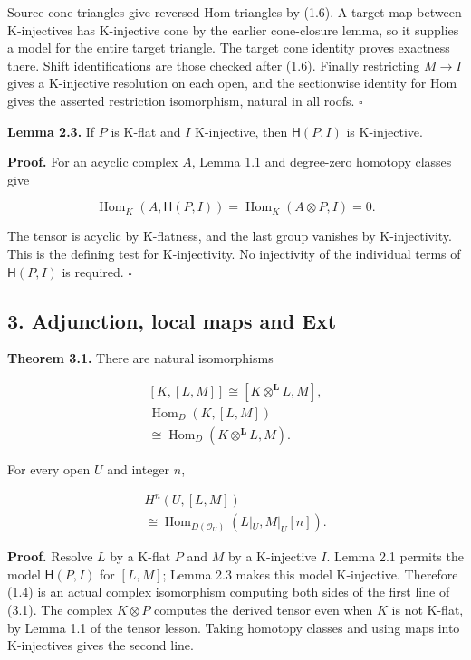 \documentclass[
  english,
  11pt,
  a4paper,
]{article}
\begin{document}
Source cone triangles give reversed Hom triangles by (1.6). A target map
between K-injectives has K-injective cone by the earlier cone-closure
lemma, so it supplies a model for the entire target triangle. The target
cone identity proves exactness there. Shift identifications are those
checked after (1.6). Finally restricting \(M\to I\) gives a K-injective
resolution on each open, and the sectionwise identity for Hom gives the
asserted restriction isomorphism, natural in all roofs. \(\square\)

\textbf{Lemma 2.3.} If \(P\) is K-flat and \(I\) K-injective, then
\(\mathsf H(P,I)\) is K-injective.

\textbf{Proof.} For an acyclic complex \(A\), Lemma 1.1 and degree-zero
homotopy classes give

\[\operatorname{Hom}_K(A,\mathsf H(P,I))
=\operatorname{Hom}_K(A\otimes P,I)=0.\]

The tensor is acyclic by K-flatness, and the last group vanishes by
K-injectivity. This is the defining test for K-injectivity. No
injectivity of the individual terms of \(\mathsf H(P,I)\) is required.
\(\square\)

\subsection{3. Adjunction, local maps and
Ext}\label{internal-derived-hom-and-ext-sheaves--3-adjunction-local-maps-and-ext}

\textbf{Theorem 3.1.} There are natural isomorphisms

\[\begin{gathered}
{}[K,[L,M]]\cong[K\otimes^{\mathbf L}L,M],\\
\operatorname{Hom}_D(K,[L,M])\\
\cong\operatorname{Hom}_D(K\otimes^{\mathbf L}L,M).
\end{gathered}
\tag{3.1}\]

For every open \(U\) and integer \(n\),

\[\begin{gathered}
H^n(U,[L,M])\\
\cong\operatorname{Hom}_{D(\mathcal O_U)}(L|_U,M|_U[n]).
\end{gathered}
\tag{3.2}\]

\textbf{Proof.} Resolve \(L\) by a K-flat \(P\) and \(M\) by a
K-injective \(I\). Lemma 2.1 permits the model \(\mathsf H(P,I)\) for
\([L,M]\); Lemma 2.3 makes this model K-injective. Therefore (1.4) is an
actual complex isomorphism computing both sides of the first line of
(3.1). The complex \(K\otimes P\) computes the derived tensor even when
\(K\) is not K-flat, by Lemma 1.1 of the tensor lesson. Taking homotopy
classes and using maps into K-injectives gives the second line.
\end{document}
